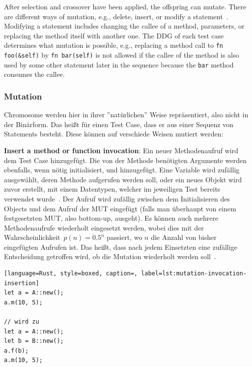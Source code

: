 \documentclass{article}
\begin{document}
After selection and crossover have been applied, the offspring can mutate. There are different ways of mutation, e.g., delete, insert, or modify a statement~\cite{Fraser2012}. Modifying a statement includes changing the callee of a method, parameters, or replacing the method itself with another one. The \ac{DDG} of each test case determines what mutation is possible, e.g., replacing a method call to \lstinline{fn foo(&self)} by \lstinline{fn bar(self)} is not allowed if the callee of the method is also used by some other statement later in the sequence because the \lstinline{bar} method consumes the callee.

\subsubsection{Mutation}
Chromosome werden hier in ihrer ''natürlichen'' Weise repräsentiert, also nicht in der Binärform. Das heißt für einen Test Case, dass er aus einer Sequenz von Statements besteht. Diese können auf verschiede Weisen mutiert werden:

\textbf{Insert a method or function invocation}: Ein neuer Methodenaufruf wird dem Test Case hinzugefügt. Die von der Methode benötigten Argumente werden ebenfalls, wenn nötig initialisiert, und hinzugefügt. Eine Variable wird zufällig ausgewählt, deren Methode aufgerufen werden soll, oder ein neues Objekt wird zuvor erstellt, mit einem Datentypen, welcher im jeweiligen Test bereits verwendet wurde~\cite{Fraser2012}. Der Aufruf wird zufällig zwischen dem Initialisieren des Objects und dem Aufruf der \ac{MUT} eingefügt (falls man überhaupt von einem festgesetzten MUT, also bottom-up, ausgeht). Es können auch mehrere Methodenaufrufe wiederholt eingesetzt werden, wobei dies mit der Wahrscheinlichkeit~$p(n) = 0.5^n$ passiert, wo $n$ die Anzahl von bisher eingefügten Aufrufen ist. Das heißt, dass nach jedem Einsetzten eine zufällige Entscheidung getroffen wird, ob die Mutation wiederholt werden soll~\cite{Tonella2004}.
\begin{lstlisting}[language=Rust, style=boxed, caption=, label=lst:mutation-invocation-insertion]
let a = A::new();
a.m(10, 5);

// wird zu
let a = A::new();
let b = B::new();
a.f(b);
a.m(10, 5);
\end{lstlisting}
\end{document}
